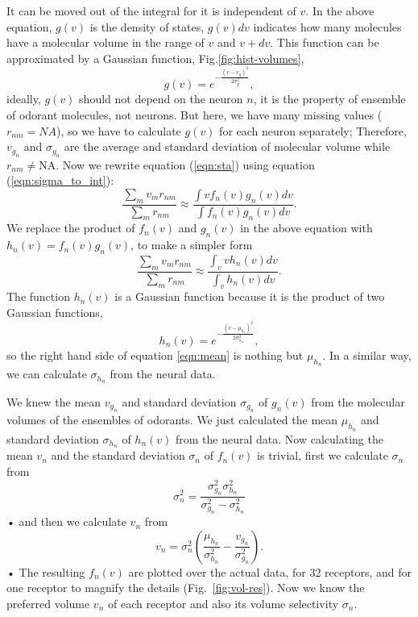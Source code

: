 \documentclass[11pt]{paper} %
\newcommand{\numberofreceptors}{32 }
\begin{document}
It can be moved out of the integral for it is independent of $v$.
In the above equation, 
$g(v)$ is the density of states, $g(v) dv$ indicates how many molecules have a molecular volume in the range of $v$ and $v+dv$.
This function can be approximated by a Gaussian function, Fig.\ref{fig:hist-volumes}, 
\begin{equation}
	g(v) = e^{-\frac{(v- v_{g})^2}{2 \sigma_{g}^2}},
	\label{eqn:hist-volumes}
\end{equation}
ideally, $g(v)$ should not depend on the neuron $n$, 
it is the property of ensemble of odorant molecules, not neurons. 
But here, we have many missing values ($r_{nm} = NA$), 
so we have to calculate $g(v)$ for each neuron separately; 
Therefore, $v_{g_n}$ and $\sigma_{g_n}$ are the average and standard deviation of molecular volume while $r_{nm} \neq \text{NA}$.
Now we rewrite equation (\ref{eqn:sta}) using equation (\ref{eqn:sigma_to_int}):
\begin{equation}
	\frac{\displaystyle \sum_{m} v_m r_{nm}}{\displaystyle \sum_{m} r_{nm}} \approx \frac{\displaystyle \int v f_n(v) g_n(v) dv}{\displaystyle \int f_n(v) g_n(v) dv}.
	\label{eqn:sta_int}
\end{equation}
We replace the product of $f_n(v)$ and $g_n(v)$ in the above equation with $h_n(v) = f_n(v) g_n(v)$, to make a simpler form
\begin{equation}
	\frac{\displaystyle \sum_{m} v_m r_{nm}}{\displaystyle \sum_{m} r_{nm}} \approx \frac{\displaystyle \int_v v h_n(v) dv}{ \displaystyle \int_v  h_n(v) dv }.
	\label{eqn:mean}
\end{equation}
The function $h_n(v)$ is a Gaussian function because it is the product of two Gaussian functions, 
\begin{equation}
h_n(v) = e^{-\frac{(v-\mu_{h_n})^2}{2\sigma_{h_n}^2}}, 
\end{equation}
so the right hand side of equation \ref{eqn:mean} is nothing but $\mu_{h_n}$. 
In a similar way, we can calculate $\sigma_{h_n}$ from the neural data.

We knew the mean $v_{g_n}$ and standard deviation $\sigma_{g_n}$ of $g_n(v)$ from the molecular volumes of the ensembles of odorants. 
We just calculated the mean $\mu_{h_n}$ and standard deviation $\sigma_{h_n}$ of $h_n(v)$ from the neural data.
Now calculating the mean $v_n$ and the standard deviation $\sigma_n$ of $f_n(v)$ is trivial,
first we calculate $\sigma_n$ from 
\begin{equation}
	\sigma_n^2 = \frac{\sigma^2_{g_n} \sigma^2_{h_n}}{\sigma^2_{g_n} - \sigma^2_{h_n}}
\end{equation}•
and then we calculate $v_n$ from 
\begin{equation}
	v_n =  \sigma_n^2 \left ( \frac{\mu_{h_n}}{\sigma^2_{h_n}} - \frac{v_{g_n}}{\sigma^2_{g_n}} \right ).
\end{equation}•
The resulting $f_n(v)$ are plotted over the actual data, for \numberofreceptors  receptors, and for one receptor to magnify the details (Fig.~\ref{fig:vol-res}).
Now we know the preferred volume $v_n$ of each receptor and also its volume selectivity $\sigma_n$.
\end{document}

